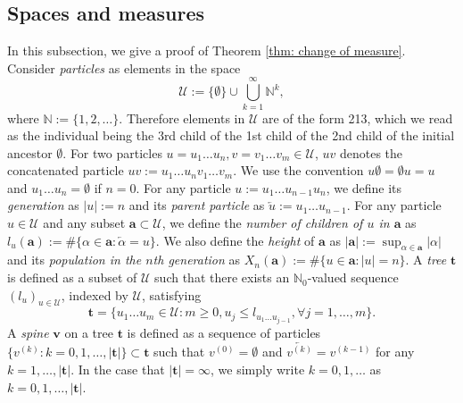 \documentclass[12pt,a4paper]{amsart}
\numberwithin{equation}{section}
\begin{document}
\subsection{Spaces and measures}
\label{sec:spacesandmeasures}
	In this subsection, we give a proof of Theorem \ref{thm: change of measure}.
 	Consider \emph{particles} as elements in the space
\begin{equation*}
		\mathcal U
	:=
	\{\emptyset\}\cup\bigcup_{k=1}^\infty \mathbb N^k,
\end{equation*}
	where $\mathbb N:=\{1,2,\dots\}$.
	Therefore elements in $\mathcal U$ are of the form 213, which we read as the individual being the 3rd child of the 1st child of the 2nd child of the initial ancestor $\emptyset$.
	For two particles $u=u_1\dots u_n, v=v_1\dots v_m\in\mathcal U$, $uv$ denotes the concatenated particle $uv:=u_1\dots u_nv_1\dots v_m$.
	We use the convention $u\emptyset = \emptyset u = u$ and $u_1\dots u_n=\emptyset$ if $n=0$.
	For any particle $u:=u_1\dots u_{n-1}u_n$, we define its \emph{generation} as $| u |:=n$ and its \emph{parent particle} as $\overleftarrow{u}:=u_1\dots u_{n-1}$.
	For any particle $u \in \mathcal U$ and any subset $\mathbf a \subset \mathcal U$, we define the \emph{number of children of $u$ in $\mathbf a$} as $l_u(\mathbf a) := \#\{\alpha\in \mathbf a:\overleftarrow{\alpha}=u\} $.
	We also define the \emph{height} of $\mathbf a$ as $|\mathbf a|:=\sup_{\alpha\in \mathbf a}|\alpha|$ and its \emph{population in the $n$th generation} as $X_n(\mathbf a):=\#\{u\in \mathbf a:|u|=n\}$.
	A \emph{tree} $ \mathbf t $ is defined as a subset of $\mathcal U$ such that there exists an $\mathbb N_0$-valued sequence $(l_u)_{u\in \mathcal U}$, 
	indexed by $\mathcal U$, satisfying
\begin{equation*}
		 \mathbf t 
	=\{u_1\dots u_m\in \mathcal U: m\ge 0, u_j\leq l_{u_1\dots u_{j-1}}, \forall  j=1,\dots,m\}.
\end{equation*}
	A \emph{spine} $ \mathbf v$ on a  tree $ \mathbf t $ is defined as a sequence of particles $\{v^{(k)}:k=0,1,\dots,| \mathbf t |\}\subset \mathbf t $ such that $v^{(0)}=\emptyset$ and $\overleftarrow{v^{(k)}}=v^{(k-1)}$ for any $k=1,\dots, | \mathbf t |$.
	In the case that $| \mathbf t |=\infty$, we simply write $k=0,1,\dots$ as $k=0,1,\dots, | \mathbf t |$.
\end{document}
